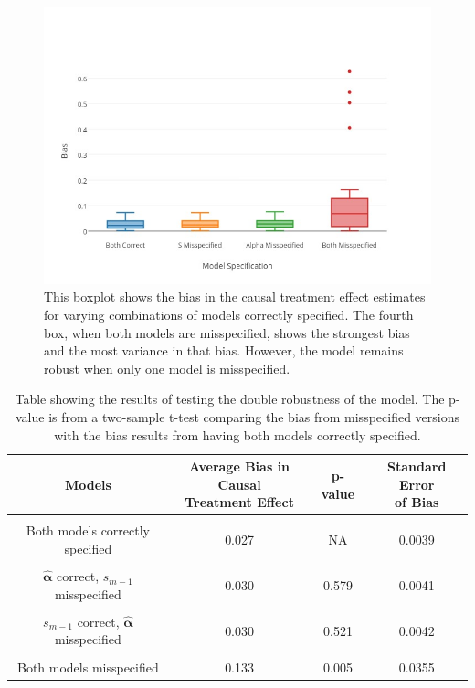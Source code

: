 \begin{figure}[h!] 
\begin{centering}
\includegraphics[width = .9\linewidth]{figures/boxplot.jpg}
\caption[Boxplot of test of double robustness]{This boxplot shows the bias in the causal treatment effect estimates for varying combinations of models correctly specified.  The fourth box, when both models are misspecified, shows the strongest bias and the most variance in that bias.  However, the model remains robust when only one model is misspecified.}
\label{boxplot}
\end{centering}
\end{figure}

\begin{table}[h!]
\centering
\begin{tabular} {c | c  c c}
Models & \shortstack{Average Bias in Causal \\ Treatment Effect} & p-value & \shortstack{Standard Error\\ of Bias} \\ 
\hline  \\
Both models correctly specified &0.027 & NA  & 0.0039\\ \\
$\hat{\mathbf{\alpha}}$ correct, $s_{m-1}$ misspecified & 0.030 & 0.579 & 0.0041\\ \\
$s_{m-1}$ correct, $\hat{\mathbf{\alpha}}$ misspecified& 0.030 & 0.521 &0.0042 \\ \\
Both models misspecified & 0.133 & 0.005 & 0.0355 
\end{tabular} \\
\centering
\caption[Testing double robustness]{Table showing the results of testing the double robustness of the model.  The p-value is from a two-sample t-test comparing the bias from misspecified versions with the bias results from having both models correctly specified. \label{doubletest}}
\end{table}

